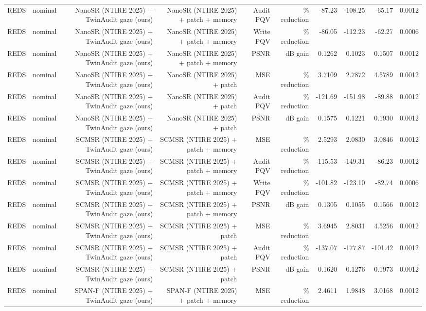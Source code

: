 \begin{table}[t]
\begin{tabular}{llrrrrrrrr}
REDS & nominal & NanoSR (NTIRE 2025) + TwinAudit gaze (ours) & NanoSR (NTIRE 2025) + patch + memory & Audit PQV & \% reduction & -87.23 & -108.25 & -65.17 & 0.0012 \\
REDS & nominal & NanoSR (NTIRE 2025) + TwinAudit gaze (ours) & NanoSR (NTIRE 2025) + patch + memory & Write PQV & \% reduction & -86.05 & -112.23 & -62.27 & 0.0006 \\
REDS & nominal & NanoSR (NTIRE 2025) + TwinAudit gaze (ours) & NanoSR (NTIRE 2025) + patch + memory & PSNR & dB gain & 0.1262 & 0.1023 & 0.1507 & 0.0012 \\
REDS & nominal & NanoSR (NTIRE 2025) + TwinAudit gaze (ours) & NanoSR (NTIRE 2025) + patch & MSE & \% reduction & 3.7109 & 2.7872 & 4.5789 & 0.0012 \\
REDS & nominal & NanoSR (NTIRE 2025) + TwinAudit gaze (ours) & NanoSR (NTIRE 2025) + patch & Audit PQV & \% reduction & -121.69 & -151.98 & -89.88 & 0.0012 \\
REDS & nominal & NanoSR (NTIRE 2025) + TwinAudit gaze (ours) & NanoSR (NTIRE 2025) + patch & PSNR & dB gain & 0.1575 & 0.1221 & 0.1930 & 0.0012 \\
REDS & nominal & SCMSR (NTIRE 2025) + TwinAudit gaze (ours) & SCMSR (NTIRE 2025) + patch + memory & MSE & \% reduction & 2.5293 & 2.0830 & 3.0846 & 0.0012 \\
REDS & nominal & SCMSR (NTIRE 2025) + TwinAudit gaze (ours) & SCMSR (NTIRE 2025) + patch + memory & Audit PQV & \% reduction & -115.53 & -149.31 & -86.23 & 0.0012 \\
REDS & nominal & SCMSR (NTIRE 2025) + TwinAudit gaze (ours) & SCMSR (NTIRE 2025) + patch + memory & Write PQV & \% reduction & -101.82 & -123.10 & -82.74 & 0.0006 \\
REDS & nominal & SCMSR (NTIRE 2025) + TwinAudit gaze (ours) & SCMSR (NTIRE 2025) + patch + memory & PSNR & dB gain & 0.1305 & 0.1055 & 0.1566 & 0.0012 \\
REDS & nominal & SCMSR (NTIRE 2025) + TwinAudit gaze (ours) & SCMSR (NTIRE 2025) + patch & MSE & \% reduction & 3.6945 & 2.8031 & 4.5256 & 0.0012 \\
REDS & nominal & SCMSR (NTIRE 2025) + TwinAudit gaze (ours) & SCMSR (NTIRE 2025) + patch & Audit PQV & \% reduction & -137.07 & -177.87 & -101.42 & 0.0012 \\
REDS & nominal & SCMSR (NTIRE 2025) + TwinAudit gaze (ours) & SCMSR (NTIRE 2025) + patch & PSNR & dB gain & 0.1620 & 0.1276 & 0.1973 & 0.0012 \\
REDS & nominal & SPAN-F (NTIRE 2025) + TwinAudit gaze (ours) & SPAN-F (NTIRE 2025) + patch + memory & MSE & \% reduction & 2.4611 & 1.9848 & 3.0168 & 0.0012 \\

\end{tabular}
\end{table}

